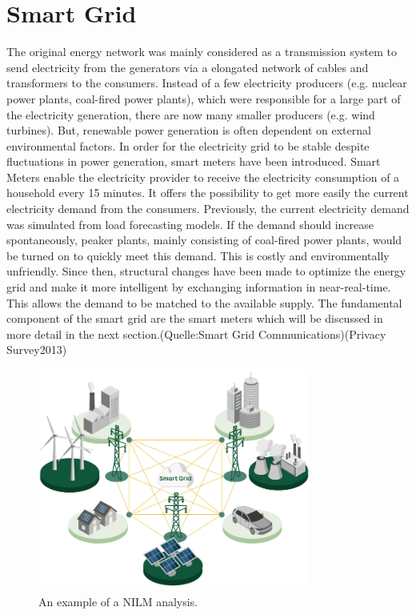 \section{Smart Grid}
The original energy network was mainly considered as a transmission system to send electricity from the generators via a elongated network of cables and transformers to the consumers.%
Instead of a few electricity producers (e.g. nuclear power plants, coal-fired power plants), which were responsible for a large part of the electricity generation, there are now many smaller producers (e.g. wind turbines). %
But, renewable power generation is often dependent on external environmental factors. In order for the electricity grid to be stable despite fluctuations in power generation, smart meters have been introduced.
Smart Meters enable the electricity provider to receive the electricity consumption of a household every 15 minutes. It offers the possibility to get more easily the current electricity demand from the consumers. Previously, the current electricity demand was simulated from load forecasting models. If the demand should increase spontaneously, peaker plants, mainly consisting of coal-fired power plants, would be turned on to quickly meet this demand. This is costly and environmentally unfriendly. 
Since then, structural changes have been made to optimize the energy grid and make it more intelligent by exchanging information in near-real-time. This allows the demand to be matched to the available supply. The fundamental component of the smart grid are the smart meters which will be discussed in more detail in the next section.(Quelle:Smart Grid Communications)(Privacy Survey2013)\begin{figure}[tbp]
  \centering
  \includegraphics[width=0.8\textwidth]{images/Smart_Grid.png}
  \caption[Short description]{An example of a NILM analysis.}
  \label{fig:Appliance_Model}
\end{figure}
